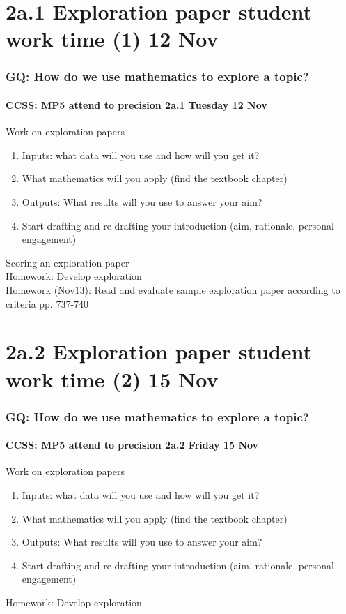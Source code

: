 \documentclass{beamer}
\begin{document}
\section{2a.1 Exploration paper student work time (1) 12 Nov}
\frame
{
  \frametitle{GQ: How do we use mathematics to explore a topic?}
  \framesubtitle{CCSS: MP5 attend to precision \hfill \alert{2a.1 Tuesday 12 Nov}}

  \begin{block}{Work on exploration papers}
  \begin{enumerate}
      \item Inputs: what data will you use and how will you get it? 
      \item What mathematics will you apply (find the textbook chapter)
      \item Outputs: What results will you use to answer your aim?
      \item Start drafting and re-drafting your introduction (aim, rationale, personal engagement)
  \end{enumerate}
  \end{block}
  Scoring an exploration paper \\
  Homework: Develop exploration \\
  Homework (Nov13): Read and evaluate sample exploration paper according to criteria pp. 737-740
}

\section{2a.2 Exploration paper student work time (2) 15 Nov}
\frame
{
  \frametitle{GQ: How do we use mathematics to explore a topic?}
  \framesubtitle{CCSS: MP5 attend to precision \hfill \alert{2a.2 Friday 15 Nov}}

  \begin{block}{Work on exploration papers}
  \begin{enumerate}
      \item Inputs: what data will you use and how will you get it? 
      \item What mathematics will you apply (find the textbook chapter)
      \item Outputs: What results will you use to answer your aim?
      \item Start drafting and re-drafting your introduction (aim, rationale, personal engagement)
  \end{enumerate}
  \end{block}
  Homework: Develop exploration 
}
\end{document}
